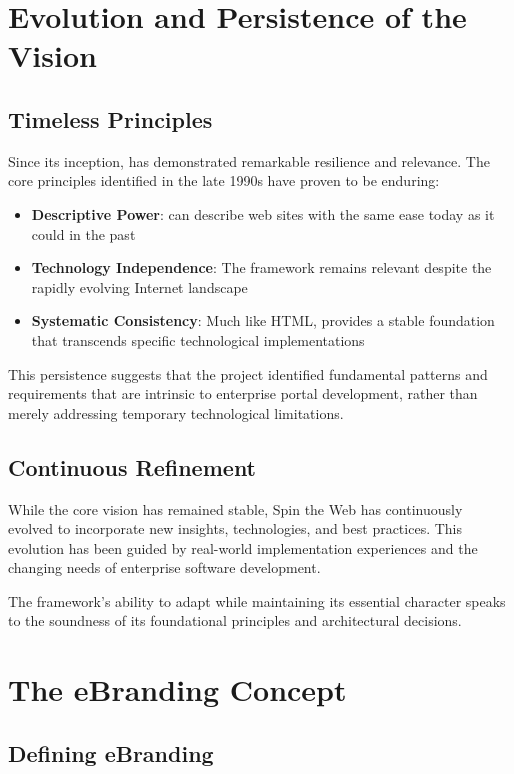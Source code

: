 \section{Evolution and Persistence of the Vision}

\subsection{Timeless Principles}

Since its inception, \wbdl{} has demonstrated remarkable resilience and relevance. The core principles identified in the late 1990s have proven to be enduring:

\begin{itemize}
\item \textbf{Descriptive Power}: \wbdl{} can describe web sites with the same ease today as it could in the past
\item \textbf{Technology Independence}: The framework remains relevant despite the rapidly evolving Internet landscape
\item \textbf{Systematic Consistency}: Much like HTML, \wbdl{} provides a stable foundation that transcends specific technological implementations
\end{itemize}

This persistence suggests that the project identified fundamental patterns and requirements that are intrinsic to enterprise portal development, rather than merely addressing temporary technological limitations.

\subsection{Continuous Refinement}

While the core vision has remained stable, Spin the Web has continuously evolved to incorporate new insights, technologies, and best practices. This evolution has been guided by real-world implementation experiences and the changing needs of enterprise software development.

The framework's ability to adapt while maintaining its essential character speaks to the soundness of its foundational principles and architectural decisions.

\section{The eBranding Concept}

\subsection{Defining eBranding}

